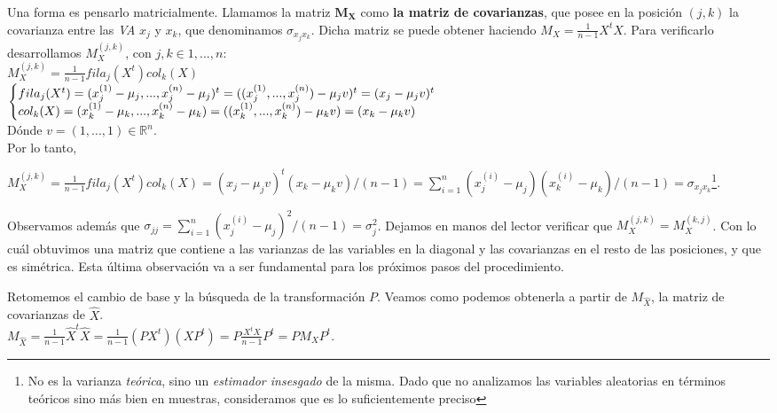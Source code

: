 Una forma es pensarlo matricialmente. Llamamos la matriz $\mathbf{M_{X}}$ como \textbf{la matriz de covarianzas}, que posee en la posici\'on $(j, k)$ la covarianza entre las \textit{VA} $x_{j}$ y $x_{k}$, que denominamos $\sigma_{x_{j}x_{k}}$. Dicha matriz se puede obtener haciendo $M_{X} = \frac{1}{n - 1}X^{t}X$. Para verificarlo desarrollamos  $M_{X}^{(j,k)}$, con $j,k \in {1, ..., n}$: \\

$M_{X}^{(j,k)} = \frac{1}{n - 1}fila_{j}(X^t)col_{k}(X)$ \\

$\Bigg\{
\begin{array}{@{}ll@{}}
	fila_{j}(X^t) = (x^{(1)}_{j} - \mu_{j}, ..., x^{(n)}_{j} - \mu_{j})^t = ((x^{(1)}_{j}, ..., x^{(n)}_{j}) - \mu_{j}v)^{t} = (x_{j} - \mu_{j}v)^{t} \\
	col_{k}(X) = (x^{(1)}_{k} - \mu_{k}, ..., x^{(n)}_{k} - \mu_{k}) = ((x^{(1)}_{k}, ..., x^{(n)}_{k}) - \mu_{k}v) = (x_{k} - \mu_{k}v)
\end{array}$ \\

D\'onde $v = (1, ..., 1) \in \mathbb{R}^{n}$. \\

Por lo tanto,

$M_{X}^{(j,k)} = \frac{1}{n - 1}fila_{j}(X^t)col_{k}(X) = (x_{j} - \mu_{j}v)^{t}(x_{k} - \mu_{k}v) / (n - 1) = \sum\limits_{i = 1}^{n}(x^{(i)}_{j} - \mu_{j})(x^{(i)}_{k} - \mu_{k}) / (n - 1) = \sigma_{x_{j}x_{k}}$\footnote{No es la varianza \textit{te\'orica}, sino un \textit{estimador insesgado} de la misma. Dado que no analizamos las variables aleatorias en t\'erminos te\'oricos sino m\'as bien en muestras, consideramos que es lo suficientemente preciso}.

Observamos adem\'as que $\sigma_{jj} = \sum\limits_{i = 1}^{n}(x_{j}^{(i)} - \mu_{j})^{2} / (n - 1) = \sigma_{j}^{2}$. Dejamos en manos del lector verificar que $M_{X}^{(j,k)} = M_{X}^{(k,j)}$. Con lo cu\'al obtuvimos una matriz que contiene a las varianzas de las variables en la diagonal y las covarianzas en el resto de las posiciones, y que es sim\'etrica. Esta \'ultima observaci\'on va a ser fundamental para los pr\'oximos pasos del procedimiento.

Retomemos el cambio de base y la b\'usqueda de la transformaci\'on $P$. Veamos como podemos obtenerla a partir de $M_{\hat{X}}$, la matriz de covarianzas de $\hat{X}$. \\

$M_{\hat{X}} = \frac{1}{n - 1}\hat{X}^{t}\hat{X} = \frac{1}{n - 1}(PX^{t})(XP^{t}) = P\frac{X^{t}X}{n - 1}P^{t} = PM_{X}P^{t}$. \\


